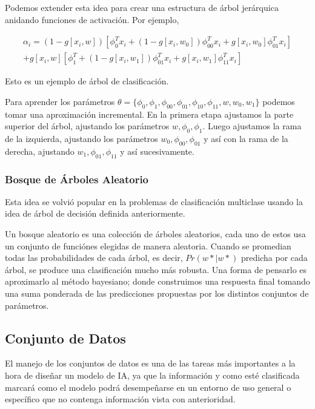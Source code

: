 \documentclass[letter,12pt]{report}
\begin{document}
Podemos extender esta idea para crear una estructura de árbol jerárquica anidando
funciones de activación. Por ejemplo,

\begin{equation}
    \begin{split}
        \alpha_i = (1-g[x_i, w]) \left[\phi_0^Tx_i+(1 - g[x_i,
        w_0])\phi_{00}^Tx_i+g[x_i,w_0]\phi_{01}^Tx_i\right] \\
        + g[x_i,w]\left[\phi_1^T + (1 -
        g[x_i, w_1])\phi_{01}^Tx_i + g[x_i, w_1]\phi_{11}^Tx_i\right]
    \end{split}
\end{equation}


Esto es un ejemplo de árbol de clasificación.

Para aprender los parámetros $\theta = \{\phi_0, \phi_1, \phi_{00}, \phi_{01}, \phi_{10},
\phi_{11}, w, w_0, w_1\}$ podemos tomar una aproximación incremental. En la primera etapa
ajustamos la parte superior del árbol, ajustando los parámetros $w, \phi_0, \phi_1$.
Luego ajustamos la rama de la izquierda, ajustando los parámetros $w_0, \phi_{00},
\phi_{01}$ y así con la rama de la derecha, ajustando $w_1, \phi_{01}, \phi_{11}$ y así
sucesivamente.

\subsubsection{Bosque de Árboles Aleatorio}
Esta idea se volvió popular en la problemas de clasificación multiclase usando la idea
de árbol de decisión definida anteriormente.

Un bosque aleatorio\cite{Forest} es una colección de árboles aleatorios, cada uno de
estos usa un conjunto de funciónes elegidas de manera aleatoria. Cuando se promedian
todas las probabilidades de cada árbol, es decir, $Pr(w*|w*)$ predicha por cada árbol, se
produce una clasificación mucho más robusta. Una forma de pensarlo es aproximarlo al
método bayesiano; donde construimos una respuesta final tomando una suma ponderada de las
predicciones propuestas por los distintos conjuntos de parámetros.

\subsection{Conjunto de Datos}
El manejo de los conjuntos de datos\cite{Manage} es una de las tareas más importantes a la hora de
diseñar un modelo de IA, ya que la información y como esté clasificada marcará como el
modelo podrá desempeñarse en un entorno de uso general o específico que no contenga
información vista con anterioridad.
\end{document}
